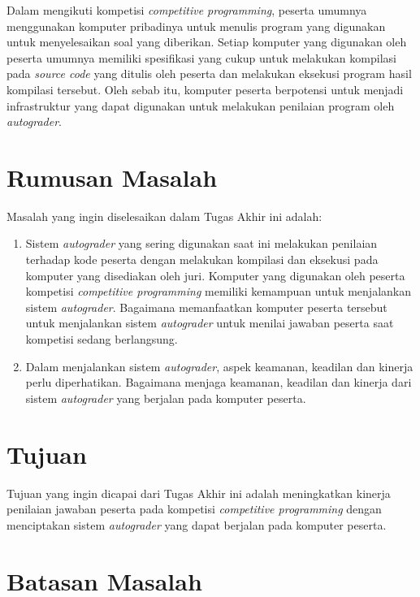 \par Dalam mengikuti kompetisi \textit{competitive programming}, peserta umumnya menggunakan komputer pribadinya untuk menulis program yang digunakan untuk menyelesaikan soal yang diberikan. Setiap komputer yang digunakan oleh peserta umumnya memiliki spesifikasi yang cukup untuk melakukan kompilasi pada \textit{source code} yang ditulis oleh peserta dan melakukan eksekusi program hasil kompilasi tersebut. Oleh sebab itu, komputer peserta berpotensi untuk menjadi infrastruktur yang dapat digunakan untuk melakukan penilaian program oleh \textit{autograder}.

\section{Rumusan Masalah}

\par Masalah yang ingin diselesaikan dalam Tugas Akhir ini adalah:
\begin{enumerate}

	\item Sistem \textit{autograder} yang sering digunakan saat ini melakukan penilaian terhadap kode peserta dengan melakukan kompilasi dan eksekusi pada komputer yang disediakan oleh juri. Komputer yang digunakan oleh peserta kompetisi \textit{competitive programming} memiliki kemampuan untuk menjalankan sistem \textit{autograder}. Bagaimana memanfaatkan komputer peserta tersebut untuk menjalankan sistem \textit{autograder} untuk menilai jawaban peserta saat kompetisi sedang berlangsung.
	
	\item Dalam menjalankan sistem \textit{autograder}, aspek keamanan, keadilan dan kinerja perlu diperhatikan. Bagaimana menjaga keamanan, keadilan dan kinerja dari sistem \textit{autograder} yang berjalan pada komputer peserta.

\end{enumerate}

\section{Tujuan}

\par Tujuan yang ingin dicapai dari Tugas Akhir ini adalah meningkatkan kinerja penilaian jawaban peserta pada kompetisi \textit{competitive programming} dengan menciptakan sistem \textit{autograder} yang dapat berjalan pada komputer peserta.

\section{Batasan Masalah}

